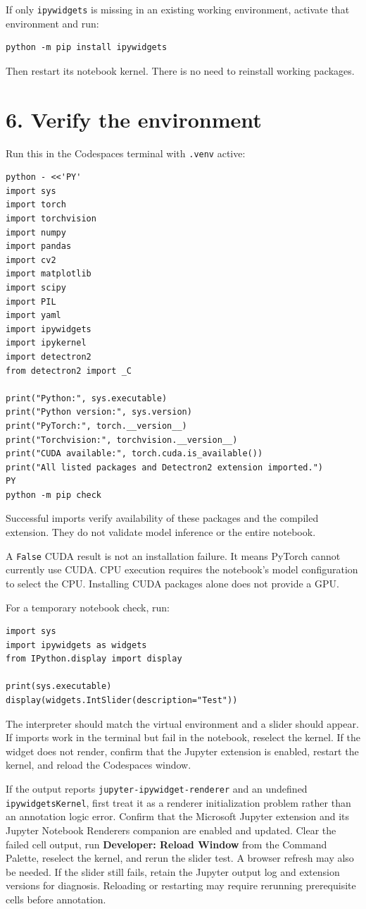 \documentclass[10pt]{article}
\begin{document}
If only \texttt{ipywidgets} is missing in an existing working environment, activate that environment and run:
\begin{lstlisting}
python -m pip install ipywidgets
\end{lstlisting}
Then restart its notebook kernel. There is no need to reinstall working packages.

\newpage
\section*{6. Verify the environment}
Run this in the Codespaces terminal with \texttt{.venv} active:
\begin{lstlisting}
python - <<'PY'
import sys
import torch
import torchvision
import numpy
import pandas
import cv2
import matplotlib
import scipy
import PIL
import yaml
import ipywidgets
import ipykernel
import detectron2
from detectron2 import _C

print("Python:", sys.executable)
print("Python version:", sys.version)
print("PyTorch:", torch.__version__)
print("Torchvision:", torchvision.__version__)
print("CUDA available:", torch.cuda.is_available())
print("All listed packages and Detectron2 extension imported.")
PY
python -m pip check
\end{lstlisting}
Successful imports verify availability of these packages and the compiled extension. They do not validate model inference or the entire notebook.

A \texttt{False} CUDA result is not an installation failure. It means PyTorch cannot currently use CUDA. CPU execution requires the notebook's model configuration to select the CPU. Installing CUDA packages alone does not provide a GPU.

For a temporary notebook check, run:
\begin{lstlisting}
import sys
import ipywidgets as widgets
from IPython.display import display

print(sys.executable)
display(widgets.IntSlider(description="Test"))
\end{lstlisting}
The interpreter should match the virtual environment and a slider should appear. If imports work in the terminal but fail in the notebook, reselect the kernel. If the widget does not render, confirm that the Jupyter extension is enabled, restart the kernel, and reload the Codespaces window.

If the output reports \texttt{jupyter-ipywidget-renderer} and an undefined \texttt{ipywidgetsKernel}, first treat it as a renderer initialization problem rather than an annotation logic error. Confirm that the Microsoft Jupyter extension and its Jupyter Notebook Renderers companion are enabled and updated. Clear the failed cell output, run \textbf{Developer: Reload Window} from the Command Palette, reselect the kernel, and rerun the slider test. A browser refresh may also be needed. If the slider still fails, retain the Jupyter output log and extension versions for diagnosis. Reloading or restarting may require rerunning prerequisite cells before annotation.
\end{document}
